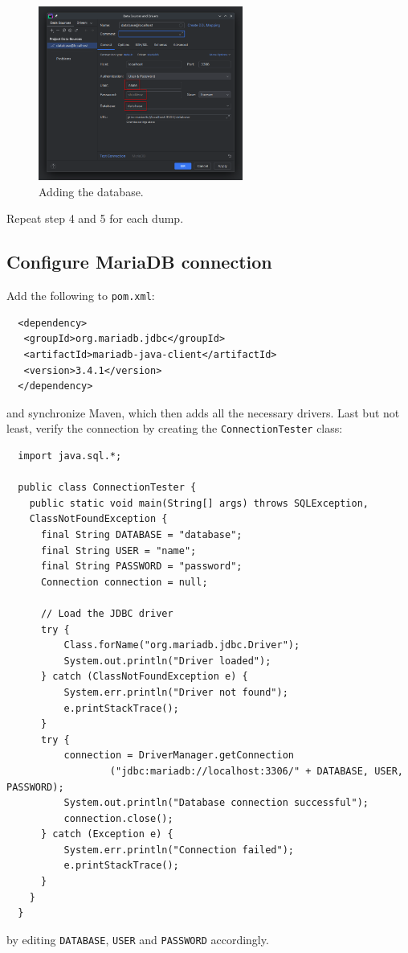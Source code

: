 \begin{enumerate}
\begin{figure}[H]
      \centering
      \includegraphics[width=0.6\textwidth]{img/datagrip/datagrip_4.png}
      \caption{Adding the database.}
    \end{figure}
\end{enumerate}

Repeat step 4 and 5 for each dump.

\newpage

\subsection{Configure MariaDB connection}

Add the following to \texttt{pom.xml}:
\begin{verbatim}
  <dependency>
   <groupId>org.mariadb.jdbc</groupId>
   <artifactId>mariadb-java-client</artifactId>
   <version>3.4.1</version>
  </dependency>
\end{verbatim}
and synchronize Maven, which then adds all the necessary drivers. Last but not least, verify the connection by creating the \texttt{ConnectionTester} class:
\begin{verbatim}
  import java.sql.*;

  public class ConnectionTester {
    public static void main(String[] args) throws SQLException,
    ClassNotFoundException {
      final String DATABASE = "database";
      final String USER = "name";
      final String PASSWORD = "password";
      Connection connection = null;

      // Load the JDBC driver
      try {
          Class.forName("org.mariadb.jdbc.Driver");
          System.out.println("Driver loaded");
      } catch (ClassNotFoundException e) {
          System.err.println("Driver not found");
          e.printStackTrace();
      }
      try {
          connection = DriverManager.getConnection
                  ("jdbc:mariadb://localhost:3306/" + DATABASE, USER, PASSWORD);
          System.out.println("Database connection successful");
          connection.close();
      } catch (Exception e) {
          System.err.println("Connection failed");
          e.printStackTrace();
      }
    }
  }
\end{verbatim}
by editing \texttt{DATABASE}, \texttt{USER} and \texttt{PASSWORD} accordingly.

